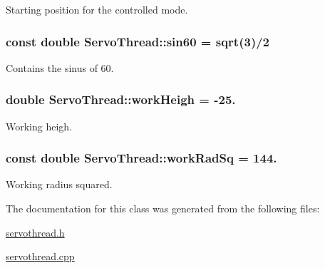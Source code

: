 Starting position for the controlled mode. 

\hypertarget{a00009_aaa3e2dd194949b12f8a41ebd0d62fde9}{}
\subsubsection[{sin60}]{\setlength{\rightskip}{0pt plus 5cm}const double Servo\+Thread\+::sin60 = sqrt(3)/2\hspace{0.3cm}{\ttfamily [private]}}\label{a00009_aaa3e2dd194949b12f8a41ebd0d62fde9}


Contains the sinus of 60. 

\hypertarget{a00009_a86b38e336a177d6dd31401af98b07172}{}
\subsubsection[{work\+Heigh}]{\setlength{\rightskip}{0pt plus 5cm}double Servo\+Thread\+::work\+Heigh = -\/25.\hspace{0.3cm}{\ttfamily [private]}}\label{a00009_a86b38e336a177d6dd31401af98b07172}


Working heigh. 

\hypertarget{a00009_a4b9e5de00a02c6f77e4308ed209f0cc0}{}
\subsubsection[{work\+Rad\+Sq}]{\setlength{\rightskip}{0pt plus 5cm}const double Servo\+Thread\+::work\+Rad\+Sq = 144.\hspace{0.3cm}{\ttfamily [private]}}\label{a00009_a4b9e5de00a02c6f77e4308ed209f0cc0}


Working radius squared. 



The documentation for this class was generated from the following files\+:\begin{DoxyCompactItemize}
\item 
\hyperlink{a00024}{servothread.\+h}\item 
\hyperlink{a00023}{servothread.\+cpp}\end{DoxyCompactItemize}
